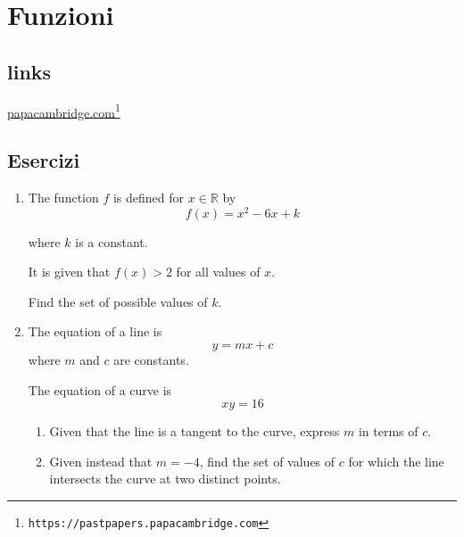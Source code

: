 \section{Funzioni} \label{sec:funzioni}

\subsection{links}


\href{https://pastpapers.papacambridge.com}{papacambridge.com}\footnote{\texttt{https://pastpapers.papacambridge.com}}


\subsection{Esercizi}

\begin{enumerate}
\item  
The function $f$ is defined for $x \in \mathbb{R}$
by 
\[
f(x) = x^2 - 6x + k
\]

where $k$ is a constant.

It is given that $f(x) > 2$ for all values of $x$.

Find the set of possible values of $k$.




\item
The equation of a line is \[ y = mx + c \] where $m$ and $c$ are constants.

The equation of a curve is \[ xy = 16 \]


\begin{enumerate}
\item Given that the line is a tangent to the curve, express $m$ in terms of $c$.
\item Given instead that $m = -4$, find the set of values of $c$ for which the line 
intersects the curve at two distinct points.
\end{enumerate}


\end{enumerate}


